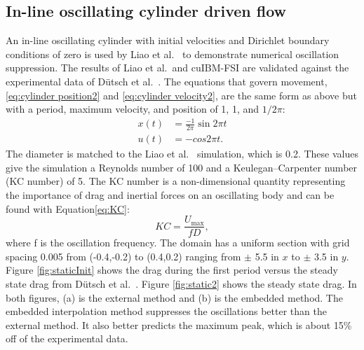 \documentclass[preprint,12pt]{elsarticle}
\begin{document}
\subsection{In-line oscillating cylinder driven flow}
\label{sec:Oscillating Cylinder in no Flow}
An in-line oscillating cylinder with initial velocities and Dirichlet boundary conditions of zero is used by Liao et al.~\cite{liao2010simulating} to demonstrate numerical oscillation suppression. 
The results of Liao et al.~and cuIBM-FSI are validated against the experimental data of D\"{u}tsch et al.~\cite{dutsch1998low}. 
The equations that govern movement, \eqref{eq:cylinder position2} and \eqref{eq:cylinder velocity2}, are the same form as above but with a period, maximum velocity, and position of 1, 1, and $1/2\pi$:
\begin{align}
x(t)&=\frac{-1}{2\pi}\sin{2\pi t}\label{eq:cylinder position2}\\
u(t)&=-cos{2\pi t}.\;\label{eq:cylinder velocity2}
\end{align}
The diameter is matched to the Liao et al.~\cite{liao2010simulating} simulation, which is 0.2. 
These values give the simulation a Reynolds number of 100 and a Keulegan–Carpenter number (KC number) of 5. 
The KC number is a non-dimensional quantity representing the importance of drag and inertial forces on an oscillating body and can be found with Equation\eqref{eq:KC}:
\begin{equation}
KC = \frac{U_\text{max}}{fD} \label{eq:KC},
\end{equation}
where f is the oscillation frequency. 
The domain has a uniform section with grid spacing 0.005 from (-0.4,-0.2) to (0.4,0.2) ranging from $\pm$ 5.5 in $x$ to $\pm$ 3.5 in $y$. 
Figure \ref{fig:staticInit} shows the drag during the first period versus the steady state drag from D\"{u}tsch et al.~\cite{dutsch1998low}. 
Figure \ref{fig:static2} shows the steady state drag. 
In both figures, (a) is the external method and (b) is the embedded method.
The embedded interpolation method suppresses the oscillations better than the external method. It also better predicts the maximum peak, which is about 15\% off of the experimental data.
\end{document}
